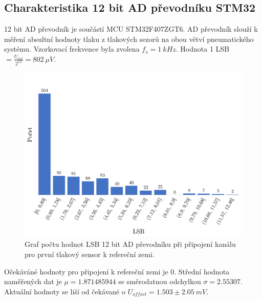 \subsection{Charakteristika 12 bit AD převodníku STM32}
12 bit AD převodník je součástí MCU STM32F407ZGT6. AD převodník slouží k měření absultní hodnoty tlaku z tlakových sezorů na obou větví pneumatického systému. Vzorkovací frekvence byla zvolena $f_s = 1 \ kHz$.
Hodnota 1 LSB $= \frac{U_{ref}}{2^{12}} = 802 \ \mu V$.
\begin{figure}[H]
    \caption{Graf počtu hodnot LSB 12 bit AD převodníku při připojení kanálu pro první tlakový sensor k refereční zemi.}
    \label{fig:hist_vacuum1_gnd}
    \includegraphics[width=1\textwidth]{graphs/vacuum1_gnd.png}

\end{figure}
Očekáváné hodnoty pro připojení k refereční zemi je 0. Střední hodnota naměřených dat je $\mu = 1.871485944$ se směrodatnou odchylkou $\sigma = 2.55307$. Aktuální hodnoty se liší od čekávané o $U_{offset} = 1.503 \pm 2.05 \ mV$.

